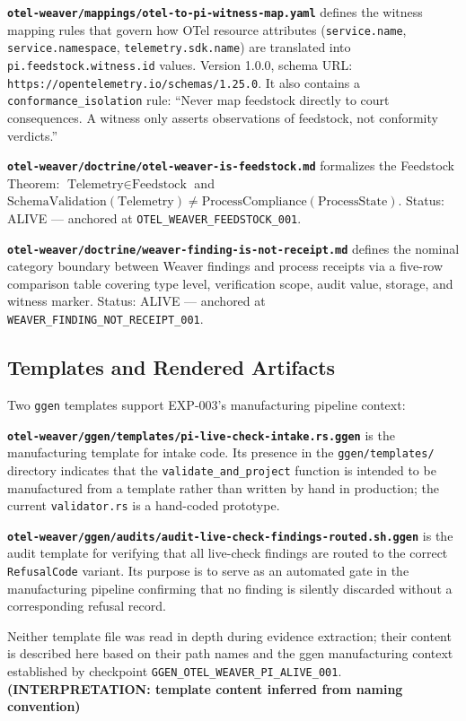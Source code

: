 \textbf{\texttt{otel-weaver/mappings/otel-to-pi-witness-map.yaml}} defines the
witness mapping rules that govern how OTel resource attributes (\texttt{service.name},
\texttt{service.namespace}, \texttt{telemetry.sdk.name}) are translated into
\texttt{pi.feedstock.witness.id} values. Version 1.0.0, schema URL:
\texttt{https://opentelemetry.io/schemas/1.25.0}. It also contains a
\texttt{conformance\_isolation} rule: ``Never map feedstock directly to court
consequences. A witness only asserts observations of feedstock, not conformity verdicts.''

\textbf{\texttt{otel-weaver/doctrine/otel-weaver-is-feedstock.md}} formalizes the
Feedstock Theorem:
$\text{Telemetry} \in \text{Feedstock}$ and
$\text{SchemaValidation}(\text{Telemetry}) \neq \text{ProcessCompliance}(\text{ProcessState})$.
Status: ALIVE --- anchored at \texttt{OTEL\_WEAVER\_FEEDSTOCK\_001}.

\textbf{\texttt{otel-weaver/doctrine/weaver-finding-is-not-receipt.md}} defines the
nominal category boundary between Weaver findings and process receipts via a five-row
comparison table covering type level, verification scope, audit value, storage, and
witness marker. Status: ALIVE --- anchored at \texttt{WEAVER\_FINDING\_NOT\_RECEIPT\_001}.

\subsection{Templates and Rendered Artifacts}
\label{sec:otel-weaver-exp-003-live-check-to-refusal-implementation-templates}

Two \texttt{ggen} templates support EXP-003's manufacturing pipeline context:

\textbf{\texttt{otel-weaver/ggen/templates/pi-live-check-intake.rs.ggen}} is the
manufacturing template for intake code. Its presence in the \texttt{ggen/templates/}
directory indicates that the \texttt{validate\_and\_project} function is intended to
be manufactured from a template rather than written by hand in production; the current
\texttt{validator.rs} is a hand-coded prototype.

\textbf{\texttt{otel-weaver/ggen/audits/audit-live-check-findings-routed.sh.ggen}}
is the audit template for verifying that all live-check findings are routed to the
correct \texttt{RefusalCode} variant. Its purpose is to serve as an automated gate
in the manufacturing pipeline confirming that no finding is silently discarded
without a corresponding refusal record.

Neither template file was read in depth during evidence extraction; their content
is described here based on their path names and the ggen manufacturing context
established by checkpoint \texttt{GGEN\_OTEL\_WEAVER\_PI\_ALIVE\_001}.
\textbf{(INTERPRETATION: template content inferred from naming convention)}
